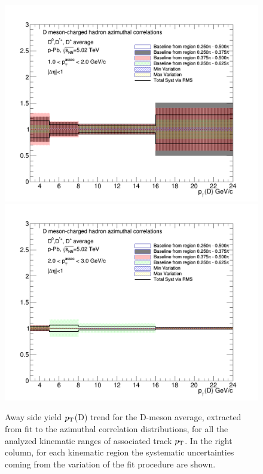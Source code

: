 \begin{figure}[!htbp]
{\includegraphics[width=0.49\linewidth, height=0.33\linewidth]{figures/FitOutput/BaselineSystematicSourcesASYield_pthad1dotto2dot.png}}
{\includegraphics[width=0.49\linewidth, height=0.33\linewidth]{figures/FitOutput/BaselineSystematicSourcesASYield_pthad2dotto3dot.png}}
\caption{Away side yield $p_{\rm T}$(D) trend for the D-meson average, extracted from fit to the azimuthal correlation distributions, for all the analyzed kinematic ranges of associated track $p_{\rm T}$. In the right column, for each kinematic region the systematic uncertainties coming from the variation of the fit procedure are shown.}
\label{fig:awaysideyieldAverage}
\end{figure}

